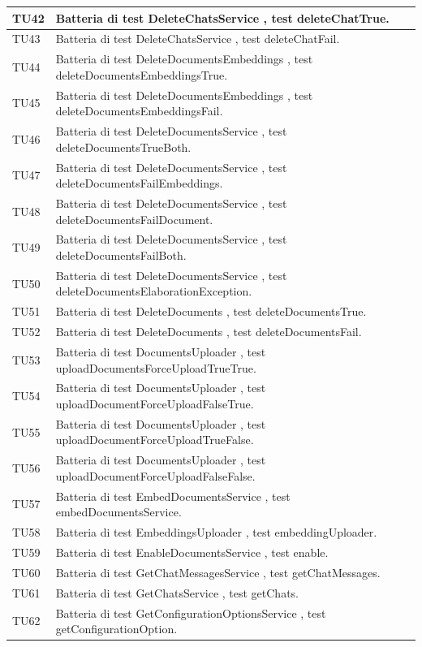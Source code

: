 \documentclass[10pt, a4paper]{article}
\begin{document}
\begin{xltabular}{\textwidth}{p{0.12\textwidth}|X}
\hline
TU42 & Batteria di test DeleteChatsService , test deleteChatTrue. \\
\hline
TU43 & Batteria di test DeleteChatsService , test deleteChatFail. \\
\hline
TU44 & Batteria di test DeleteDocumentsEmbeddings , test deleteDocumentsEmbeddingsTrue. \\
\hline
TU45 & Batteria di test DeleteDocumentsEmbeddings , test deleteDocumentsEmbeddingsFail. \\
\hline
TU46 & Batteria di test DeleteDocumentsService , test deleteDocumentsTrueBoth. \\
\hline
TU47 & Batteria di test DeleteDocumentsService , test deleteDocumentsFailEmbeddings. \\
\hline
TU48 & Batteria di test DeleteDocumentsService , test deleteDocumentsFailDocument. \\
\hline
TU49 & Batteria di test DeleteDocumentsService , test deleteDocumentsFailBoth. \\
\hline
TU50 & Batteria di test DeleteDocumentsService , test deleteDocumentsElaborationException. \\
\hline
TU51 & Batteria di test DeleteDocuments , test deleteDocumentsTrue. \\
\hline
TU52 & Batteria di test DeleteDocuments , test deleteDocumentsFail. \\
\hline
TU53 & Batteria di test DocumentsUploader , test uploadDocumentsForceUploadTrueTrue. \\
\hline
TU54 & Batteria di test DocumentsUploader , test uploadDocumentForceUploadFalseTrue. \\
\hline
TU55 & Batteria di test DocumentsUploader , test uploadDocumentForceUploadTrueFalse. \\
\hline
TU56 & Batteria di test DocumentsUploader , test uploadDocumentForceUploadFalseFalse. \\
\hline
TU57 & Batteria di test EmbedDocumentsService , test embedDocumentsService. \\
\hline
TU58 & Batteria di test EmbeddingsUploader , test embeddingUploader. \\
\hline
TU59 & Batteria di test EnableDocumentsService , test enable. \\
\hline
TU60 & Batteria di test GetChatMessagesService , test getChatMessages. \\
\hline
TU61 & Batteria di test GetChatsService , test getChats. \\
\hline
TU62 & Batteria di test GetConfigurationOptionsService , test getConfigurationOption. \\

\end{xltabular}
\end{document}
